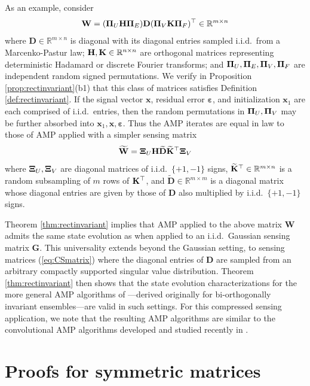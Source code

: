 \documentclass[10pt,reqno]{amsart}
\def\x{\mathbf{x}}
\def\W{\mathbf{W}}
\def\G{\mathbf{G}}
\def\D{\mathbf{D}}
\def\R{\mathbb{R}}
\def\bW{{\mathbf{W}}}
\begin{document}
\begin{example}
As an example, consider
\begin{equation}\label{eq:CSmatrix}
\W=(\bPi_U\bH\bPi_E)\D(\bPi_V \bK\bPi_F)^\top \in \R^{m \times n}
\end{equation}
where $\D \in \R^{m \times n}$ is diagonal with its diagonal entries sampled
i.i.d.\ from a Marcenko-Pastur law;
$\bH,\bK \in \R^{n \times n}$ are orthogonal matrices
representing deterministic Hadamard or discrete Fourier transforms; and
$\bm{\Pi}_U,\bm{\Pi}_E,\bm{\Pi}_V,\bm{\Pi}_F$
are independent random signed permutations. 
We verify in Proposition \ref{prop:rectinvariant}(b1) that this class of
matrices satisfies Definition \ref{def:rectinvariant}. 
If the signal vector $\x$, residual error $\bm{\varepsilon}$, and
initialization $\x_1$ are each comprised of i.i.d.\ entries, then
the random permutations in $\bm{\Pi}_U,\bm{\Pi}_V$ may be further
absorbed into $\x_1,\x,\bm{\varepsilon}$. Thus
the AMP iterates are equal in law to those of AMP applied with a
simpler sensing matrix
\[\widetilde{\bW}=\bXi_U\bH\widetilde{\D}\widetilde{\bK}^\top\bXi_V\]
where $\bm{\Xi}_U,\bm{\Xi}_V$ are diagonal matrices of i.i.d.\ $\{+1,-1\}$ signs,
$\widetilde{\bK}^\top \in \R^{m \times n}$ is a random subsampling of $m$ rows 
of $\mathbf{K}^\top$, and $\widetilde{\D} \in \R^{m \times m}$ is a diagonal matrix
whose diagonal entries are given by those of $\D$ also multiplied by 
i.i.d.\ $\{+1,-1\}$ signs.

Theorem \ref{thm:rectinvariant} implies
that AMP applied to the above matrix $\W$ admits
the same state evolution as when applied to an
i.i.d.\ Gaussian sensing matrix $\G$.
This universality extends beyond the Gaussian setting, to sensing matrices
(\ref{eq:CSmatrix}) where the diagonal entries of $\D$ are sampled from an
arbitrary compactly supported singular value distribution.
Theorem \ref{thm:rectinvariant} then shows that the state evolution
characterizations for the more general AMP algorithms
of \cite{fan2022approximate}---derived originally for bi-orthogonally invariant
ensembles---are valid in such settings. For this compressed sensing application,
we note that the resulting AMP algorithms are similar to the convolutional AMP
algorithms developed and studied recently in
\cite{takeuchi2020convolutional,takeuchi2021bayes}.
\end{example}


\section{Proofs for symmetric matrices}\label{sec:proofs}
\end{document}
